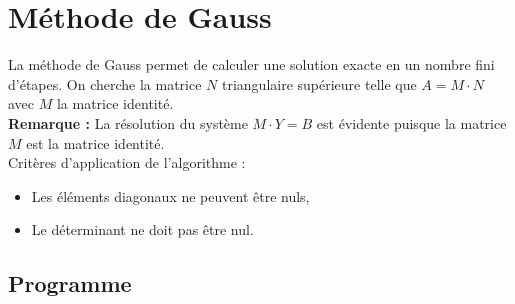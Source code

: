 \documentclass{report}
\begin{document}
    \section{Méthode de Gauss}
      La méthode de Gauss permet de calculer une solution exacte en un nombre fini d'étapes.
      \newline
      On cherche la matrice $N$ triangulaire supérieure telle que $A = M \cdot N$ avec $M$ la matrice identité.\\
      \newline
      \textbf{Remarque :} La résolution du système $M \cdot Y = B$ est évidente puisque la matrice $M$ est la matrice identité.\\
      
      Critères d'application de l'algorithme :
      \begin{itemize}
        \item{Les éléments diagonaux ne peuvent être nuls,}
        \item{Le déterminant ne doit pas être nul.}
      \end{itemize}
        \lstset{language=C,showstringspaces=false}
      \subsection{Programme}
        
      \newpage
\end{document}
